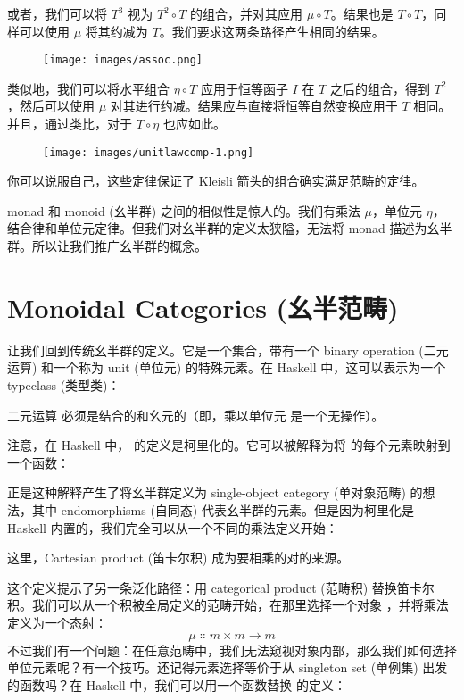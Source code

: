 \noindent
或者，我们可以将 $T^3$ 视为 $T^2 \circ T$ 的组合，并对其应用 $\mu \circ T$。结果也是 $T \circ T$，同样可以使用 $\mu$ 将其约减为 $T$。我们要求这两条路径产生相同的结果。

\begin{figure}[H]
  \centering
  \texttt{[image: images/assoc.png]}
\end{figure}

\noindent
类似地，我们可以将水平组合 $\eta \circ T$ 应用于恒等函子 $I$ 在 $T$ 之后的组合，得到 $T^2$，然后可以使用 $\mu$ 对其进行约减。结果应与直接将恒等自然变换应用于 $T$ 相同。并且，通过类比，对于 $T \circ \eta$ 也应如此。

\begin{figure}[H]
  \centering
  \texttt{[image: images/unitlawcomp-1.png]}
\end{figure}

\noindent
你可以说服自己，这些定律保证了 Kleisli 箭头的组合确实满足范畴的定律。

monad 和 monoid (幺半群) 之间的相似性是惊人的。我们有乘法 $\mu$，单位元 $\eta$，结合律和单位元定律。但我们对幺半群的定义太狭隘，无法将 monad 描述为幺半群。所以让我们推广幺半群的概念。

\section{Monoidal Categories (幺半范畴)}

让我们回到传统幺半群的定义。它是一个集合，带有一个 binary operation (二元运算) 和一个称为 unit (单位元) 的特殊元素。在 Haskell 中，这可以表示为一个 typeclass (类型类)：

二元运算  必须是结合的和幺元的（即，乘以单位元  是一个无操作）。

注意，在 Haskell 中， 的定义是柯里化的。它可以被解释为将  的每个元素映射到一个函数：

正是这种解释产生了将幺半群定义为 single-object category (单对象范畴) 的想法，其中 endomorphisms (自同态)  代表幺半群的元素。但是因为柯里化是 Haskell 内置的，我们完全可以从一个不同的乘法定义开始：

这里，Cartesian product (笛卡尔积)  成为要相乘的对的来源。

这个定义提示了另一条泛化路径：用 categorical product (范畴积) 替换笛卡尔积。我们可以从一个积被全局定义的范畴开始，在那里选择一个对象 ，并将乘法定义为一个态射：
\[\mu \Colon m\times{}m \to m\]
不过我们有一个问题：在任意范畴中，我们无法窥视对象内部，那么我们如何选择单位元素呢？有一个技巧。还记得元素选择等价于从 singleton set (单例集) 出发的函数吗？在 Haskell 中，我们可以用一个函数替换  的定义：

